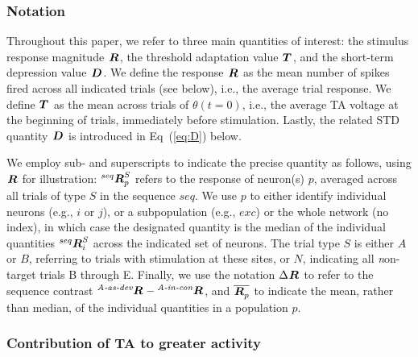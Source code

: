 \documentclass[10pt,letterpaper]{article}
\newcommand{\dev}{\textit{A-as-dev}}
\newcommand{\msc}{\textit{A-in-con}}
\newcommand{\std}{\textit{A-as-std}}
\newcommand{\ifstringequal}[4]{%
  \ifnum\pdfstrcmp{#1}{#2}=0
  #3%
  \else
  #4%
  \fi
}
\newcommand{\seqreplace}[1]{\ifstringequal{dev}{#1}{\dev}{%
    \ifstringequal{std}{#1}{\std}{%
        \ifstringequal{msc}{#1}{\msc}{#1}%
    }%
}}
\newcommand{\R}[3][]{{}^{\seqreplace{#1}}_{}\boldsymbol R^{#2}_{#3}}
\newcommand{\T}[3][]{{}^{\seqreplace{#1}}_{}\boldsymbol T^{#2}_{#3}}
\newcommand{\D}[3][]{{}^{\seqreplace{#1}}_{}\boldsymbol D^{#2}_{#3}}
\newcommand{\mean}[1]{\overline{#1}}
\newcommand{\EQ}[1]{Eq~(\ref{eq:#1})}
\begin{document}
\subsubsection*{Notation}

Throughout this paper, we refer to three main quantities of interest: the stimulus response magnitude $\R{}{}$, the threshold adaptation value $\T{}{}$, and the short-term depression value $\D{}{}$. We define the response $\R{}{}$ as the mean number of spikes fired across all indicated trials (see below), i.e., the average trial response. We define $\T{}{}$ as the mean across trials of $\theta(t=0)$, i.e., the average TA voltage at the beginning of trials, immediately before stimulation. Lastly, the related STD quantity $\D{}{}$ is introduced in \EQ{D} below.

We employ sub- and superscripts to indicate the precise quantity as follows, using $\R{}{}$ for illustration: $\R[seq]{S}{p}$ refers to the response of neuron(s) $p$, averaged across all trials of type $S$ in the sequence $seq$. We use $p$ to either identify individual neurons (e.g., $i$ or $j$), or a subpopulation (e.g., $exc$) or the whole network (no index), in which case the designated quantity is the median of the individual quantities $\R[seq]{S}{i}$ across the indicated set of neurons. The trial type $S$ is either $A$ or $B$, referring to trials with stimulation at these sites, or $N$, indicating all \textit{n}on-target trials B through E. Finally, we use the notation $\Delta \R{}{}$ to refer to the sequence contrast $\R[dev]{}{} - \R[msc]{}{}$, and $\mean{\R{}{p}}$ to indicate the mean, rather than median, of the individual quantities in a population $p$.

\subsubsection*{Contribution of TA to greater activity}
\end{document}
